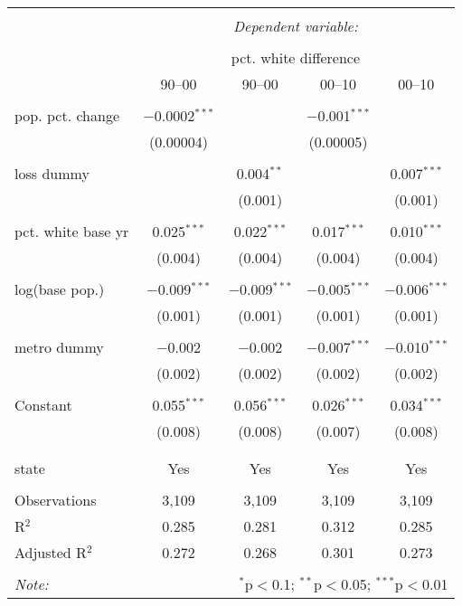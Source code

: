 \documentclass{standalone}
\begin{document}
\begin{tabular}{@{\extracolsep{5pt}}lcccc} 
\\[-1.8ex]\hline 
\hline \\[-1.8ex] 
 & \multicolumn{4}{c}{\textit{Dependent variable:}} \\ 
\cline{2-5} 
\\[-1.8ex] & \multicolumn{4}{c}{pct. white difference} \\ 
 & 90--00 & 90--00 & 00--10 & 00--10 \\ 
\hline \\[-1.8ex] 
 pop. pct. change & $-$0.0002$^{***}$ &  & $-$0.001$^{***}$ &  \\ 
  & (0.00004) &  & (0.00005) &  \\ 
  & & & & \\ 
 loss dummy &  & 0.004$^{**}$ &  & 0.007$^{***}$ \\ 
  &  & (0.001) &  & (0.001) \\ 
  & & & & \\ 
 pct. white base yr & 0.025$^{***}$ & 0.022$^{***}$ & 0.017$^{***}$ & 0.010$^{***}$ \\ 
  & (0.004) & (0.004) & (0.004) & (0.004) \\ 
  & & & & \\ 
 log(base pop.) & $-$0.009$^{***}$ & $-$0.009$^{***}$ & $-$0.005$^{***}$ & $-$0.006$^{***}$ \\ 
  & (0.001) & (0.001) & (0.001) & (0.001) \\ 
  & & & & \\ 
 metro dummy & $-$0.002 & $-$0.002 & $-$0.007$^{***}$ & $-$0.010$^{***}$ \\ 
  & (0.002) & (0.002) & (0.002) & (0.002) \\ 
  & & & & \\ 
 Constant & 0.055$^{***}$ & 0.056$^{***}$ & 0.026$^{***}$ & 0.034$^{***}$ \\ 
  & (0.008) & (0.008) & (0.007) & (0.008) \\ 
  & & & & \\ 
\hline \\[-1.8ex] 
state & Yes & Yes & Yes & Yes \\ 
\hline \\[-1.8ex] 
Observations & 3,109 & 3,109 & 3,109 & 3,109 \\ 
R$^{2}$ & 0.285 & 0.281 & 0.312 & 0.285 \\ 
Adjusted R$^{2}$ & 0.272 & 0.268 & 0.301 & 0.273 \\ 
\hline 
\hline \\[-1.8ex] 
\textit{Note:}  & \multicolumn{4}{r}{$^{*}$p$<$0.1; $^{**}$p$<$0.05; $^{***}$p$<$0.01} \\ 
\end{tabular} 
\end{document}
